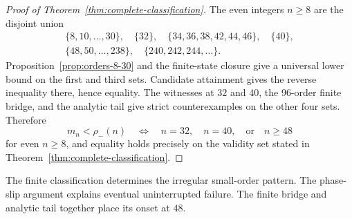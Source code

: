\begin{proof}[Proof of Theorem~\ref{thm:complete-classification}]
The even integers \(n\geq8\) are the disjoint union
\[
\begin{gathered}
\{8,10,\ldots,30\},\quad\{32\},\quad
\{34,36,38,42,44,46\},\quad\{40\},\\
\{48,50,\ldots,238\},\quad
\{240,242,244,\ldots\}.
\end{gathered}
\]
Proposition~\ref{prop:orders-8-30} and the finite-state closure give a
universal lower bound on the first and third sets.  Candidate attainment
gives the reverse inequality there, hence equality. The witnesses at
\(32\) and \(40\), the 96-order finite bridge, and the analytic tail give
strict counterexamples on the other four sets.  Therefore
\[
m_n<\rho_-(n)
\quad\Longleftrightarrow\quad
n=32,\quad n=40,\quad\text{or}\quad n\geq48
\]
for even \(n\geq8\), and equality holds precisely on the validity set stated
in Theorem~\ref{thm:complete-classification}.
\end{proof}

The finite classification determines the irregular small-order pattern.
The phase-slip argument explains eventual uninterrupted failure. The finite
bridge and analytic tail together place its onset at \(48\).
